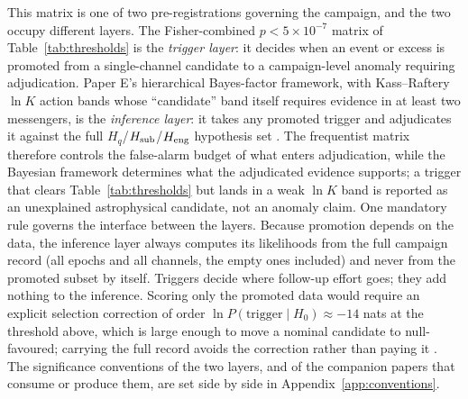 \documentclass[11pt]{article}
\begin{document}
This matrix is one of two pre-registrations governing the campaign, and the two occupy different layers. The Fisher-combined $p < 5\times10^{-7}$ matrix of Table~\ref{tab:thresholds} is the \emph{trigger layer}: it decides when an event or excess is promoted from a single-channel candidate to a campaign-level anomaly requiring adjudication. Paper E's hierarchical Bayes-factor framework, with Kass--Raftery $\ln K$ action bands \citep{Kass1995} whose ``candidate'' band itself requires evidence in at least two messengers, is the \emph{inference layer}: it takes any promoted trigger and adjudicates it against the full $H_q$/$H_{\rm sub}$/$H_{\rm eng}$ hypothesis set \citep{Swanson2026Engineered}. The frequentist matrix therefore controls the false-alarm budget of what enters adjudication, while the Bayesian framework determines what the adjudicated evidence supports; a trigger that clears Table~\ref{tab:thresholds} but lands in a weak $\ln K$ band is reported as an unexplained astrophysical candidate, not an anomaly claim. One mandatory rule governs the interface between the layers. Because promotion depends on the data, the inference layer always computes its likelihoods from the full campaign record (all epochs and all channels, the empty ones included) and never from the promoted subset by itself. Triggers decide where follow-up effort goes; they add nothing to the inference. Scoring only the promoted data would require an explicit selection correction of order $\ln P(\text{trigger}\mid H_0) \approx -14$ nats at the threshold above, which is large enough to move a nominal candidate to null-favoured; carrying the full record avoids the correction rather than paying it \citep{Swanson2026Engineered}. The significance conventions of the two layers, and of the companion papers that consume or produce them, are set side by side in Appendix~\ref{app:conventions}.
\end{document}
